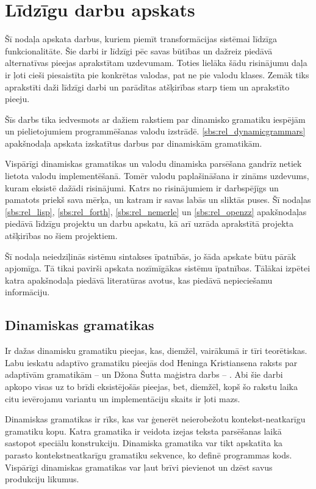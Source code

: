 \section{Līdzīgu darbu apskats}
\label{s:related}

Šī nodaļa apskata darbus, kuriem piemīt transformācijas sistēmai līdzīga funkcionalitāte. Šie darbi ir līdzīgi pēc savas būtības un dažreiz piedāvā alternatīvas pieejas aprakstītam uzdevumam. Toties lielāka šādu risinājumu daļa ir ļoti cieši piesaistīta pie konkrētas valodas, pat ne pie valodu klases. Zemāk tiks aprakstīti daži līdzīgi darbi un parādītas atšķirības starp tiem un aprakstīto pieeju.

Šīs darbs tika iedvesmots ar dažiem rakstiem par dinamisko gramatiku iespējām un pielietojumiem programmēšanas valodu izstrādē. \ref{sbs:rel_dynamicgrammars} apakšnodaļa apskata izskatītus darbus par dinamiskām gramatikām.

Vispārīgi dinamiskas gramatikas un valodu dinamiska parsēšana gandrīz netiek lietota valodu implementēšanā. Tomēr valodu paplašināšana ir zināms uzdevums, kuram eksistē dažādi risinājumi. Katrs no risinājumiem ir darbspējīgs un pamatots priekš sava mērķa, un katram ir savas labās un sliktās puses. Šī nodaļas \ref{sbs:rel_lisp}, \ref{sbs:rel_forth}, \ref{sbs:rel_nemerle} un \ref{sbs:rel_openzz} apakšnodaļas piedāvā līdzīgu projektu un darbu apskatu, kā arī uzrāda aprakstītā projekta atšķirības no šiem projektiem.

Šī nodaļa neiedziļinās sistēmu sintakses īpatnībās, jo šāda apskate būtu pārāk apjomīga. Tā tikai pavirši apskata nozīmīgākas sistēmu īpatnības. Tālākai izpētei katra apakšnodaļa piedāvā literatūras avotus, kas piedāvā nepieciešamu informāciju.

\subsection{\label{sbs:rel_dynamicgrammars}Dinamiskas gramatikas}

Ir dažas dinamisku gramatiku pieejas, kas, diemžēl, vairākumā ir tīri teorētiskas. Labu ieskatu adaptīvo gramatiku pieejās dod Heninga Kristiansena raksts par adaptīvām gramatikām --\cite{Christiansen:SurveyAdaptableGrammars} un Džona Šutta maģistra darbs -- \cite{Shutt:AdaptiveGrammars}. Abi šie darbi apkopo visas uz to brīdi eksistējošās pieejas, bet, diemžēl, kopš šo rakstu laika citu ievērojamu variantu un implementāciju skaits ir ļoti mazs.

Dinamiskas gramatikas ir rīks, kas var ģenerēt neierobežotu kontekst-neatkarīgu gramatiku kopu. Katra gramatika ir veidota izejas teksta parsēšanas laikā sastopot speciālu konstrukciju. Dinamiska gramatika var tikt apskatīta ka parasto kontekstneatkarīgu gramatiku sekvence, ko definē programmas kods. Vispārīgi dinamiskas gramatikas var ļaut brīvi pievienot un dzēst savus produkciju likumus.

